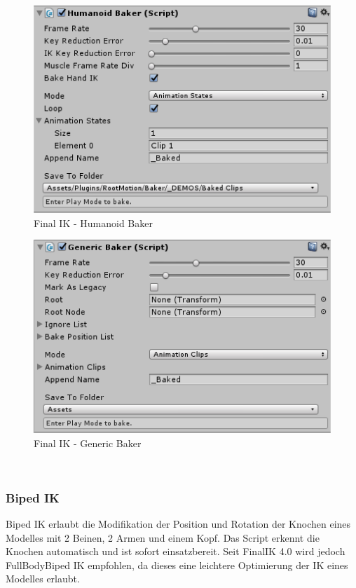 \begin{itemize}
\begin {figure}
    \centering
    \includegraphics[scale=1]{pics/finalik_baker_HumanoidBakerComponent}
    \caption{Final IK - Humanoid Baker}
    \label{fig:finalIK_humanoid_baker}
\end {figure}
\begin {figure}
    \centering
    \includegraphics[scale=1]{pics/finalik_baker_GenericBakerComponent}
    \caption{Final IK - Generic Baker}
    \label{fig:finalIK_generic_baker}
\end {figure}
~\cite{FinalIK_Baker_2021}

\subsubsection{Biped IK}
Biped IK erlaubt die Modifikation der Position und Rotation der Knochen eines Modelles mit 2 Beinen, 2 Armen und einem Kopf.
Das Script erkennt die Knochen automatisch und ist sofort einsatzbereit.
Seit FinalIK 4.0 wird jedoch FullBodyBiped IK empfohlen, da dieses eine leichtere Optimierung der IK eines Modelles erlaubt.


\end{itemize}
